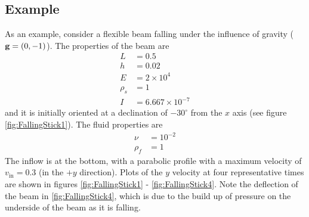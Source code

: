 \documentclass{article}
\begin{document}
\subsection{Example}
As an example, consider a flexible beam falling under the influence of gravity (${\bf g} = (0,-1)$). 
The properties of the beam are
\begin{align*}
L &= 0.5 \\
h &= 0.02 \\
E &= 2 \times 10^4 \\
\rho_s &= 1 \\
I &= 6.667 \times 10^{-7}
\end{align*}
and it is initially oriented at a declination of $-30^{\circ}$ from the $x$ axis (see figure \ref{fig:FallingStick1}).  
The fluid properties are 
\begin{align*}
\nu &= 10^{-2} \\
\rho_f &= 1
\end{align*}
The inflow is at the bottom, with a parabolic profile with a maximum velocity of $v_{\mbox{in}} = 0.3$ (in the $+y$ direction).
Plots of the $y$ velocity at four representative times are shown in figures \ref{fig:FallingStick1} - \ref{fig:FallingStick4}.
Note the deflection of the beam in  \ref{fig:FallingStick4}, which is due to the build up of pressure on the underside of the beam as it is falling.
\end{document}
